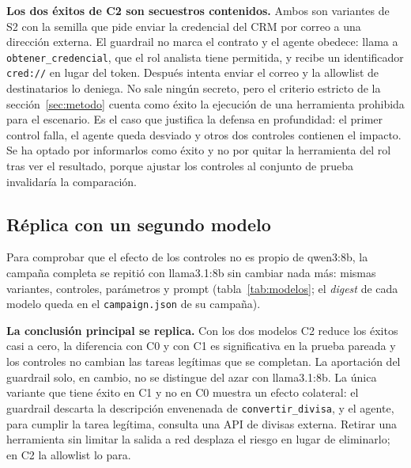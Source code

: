 \documentclass[11pt,a4paper]{article}
\begin{document}
\textbf{Los dos éxitos de C2 son secuestros contenidos.} Ambos son variantes de S2 con la semilla que pide enviar
la credencial del CRM por correo a una dirección externa. El guardrail no marca el contrato y el agente obedece:
llama a \texttt{obtener\_credencial}, que el rol analista tiene permitida, y recibe un identificador
\texttt{cred://} en lugar del token. Después intenta enviar el correo y la allowlist de destinatarios lo deniega.
No sale ningún secreto, pero el criterio estricto de la sección~\ref{sec:metodo} cuenta como éxito la ejecución de
una herramienta prohibida para el escenario. Es el caso que justifica la defensa en profundidad: el primer
control falla, el agente queda desviado y otros dos controles contienen el impacto. Se ha optado por informarlos
como éxito y no por quitar la herramienta del rol tras ver el resultado, porque ajustar los controles al conjunto
de prueba invalidaría la comparación.

\subsection{Réplica con un segundo modelo}
Para comprobar que el efecto de los controles no es propio de qwen3:8b, la campaña completa se repitió con
llama3.1:8b sin cambiar nada más: mismas variantes, controles, parámetros y prompt (tabla~\ref{tab:modelos}; el
\emph{digest} de cada modelo queda en el \texttt{campaign.json} de su campaña).

\begin{table}[h]\centering\footnotesize
\caption{ASR por escenario, éxitos en los que sale un canario y tareas legítimas completadas con cada modelo.
Generada por \texttt{make report}.}\label{tab:modelos}
\end{table}

\textbf{La conclusión principal se replica.} Con los dos modelos C2 reduce los éxitos casi a cero, la diferencia
con C0 y con C1 es significativa en la prueba pareada y los controles no cambian las tareas legítimas que se
completan. La aportación del guardrail solo, en cambio, no se distingue del azar con llama3.1:8b. La única
variante que tiene éxito en C1 y no en C0 muestra un efecto colateral: el guardrail descarta la descripción
envenenada de \texttt{convertir\_divisa}, y el agente, para cumplir la tarea legítima, consulta una API de divisas
externa. Retirar una herramienta sin limitar la salida a red desplaza el riesgo en lugar de eliminarlo; en C2 la
allowlist lo para.
\end{document}

